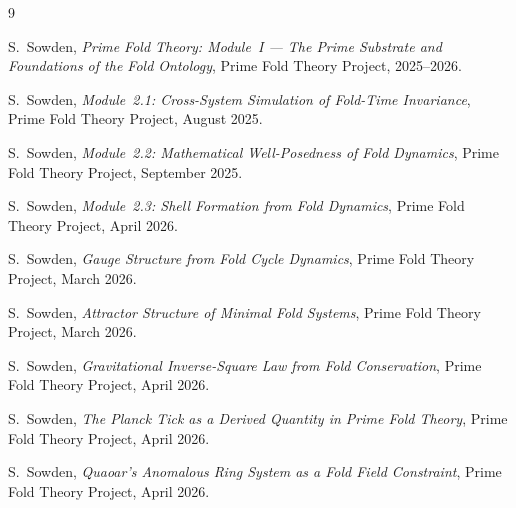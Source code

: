 \documentclass[12pt]{article}
\begin{document}
\begin{thebibliography}{9}

S.~Sowden, \textit{Prime Fold Theory: Module~I --- The Prime Substrate
and Foundations of the Fold Ontology}, Prime Fold Theory Project,
2025--2026.

S.~Sowden, \textit{Module~2.1: Cross-System Simulation of Fold-Time
Invariance}, Prime Fold Theory Project, August 2025.

S.~Sowden, \textit{Module~2.2: Mathematical Well-Posedness of Fold
Dynamics}, Prime Fold Theory Project, September 2025.

S.~Sowden, \textit{Module~2.3: Shell Formation from Fold Dynamics},
Prime Fold Theory Project, April 2026.

S.~Sowden, \textit{Gauge Structure from Fold Cycle Dynamics},
Prime Fold Theory Project, March 2026.

S.~Sowden, \textit{Attractor Structure of Minimal Fold Systems},
Prime Fold Theory Project, March 2026.

S.~Sowden, \textit{Gravitational Inverse-Square Law from Fold
Conservation}, Prime Fold Theory Project, April 2026.

S.~Sowden, \textit{The Planck Tick as a Derived Quantity in Prime
Fold Theory}, Prime Fold Theory Project, April 2026.

S.~Sowden, \textit{Quaoar's Anomalous Ring System as a Fold
Field Constraint}, Prime Fold Theory Project, April 2026.

\end{thebibliography}
\end{document}
